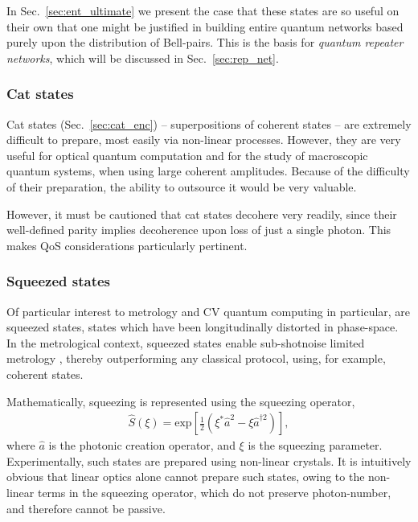 In Sec.~\ref{sec:ent_ultimate} we present the case that these states are so useful on their own that one might be justified in building entire quantum networks based purely upon the distribution of Bell-pairs. This is the basis for \textit{quantum repeater networks}, which will be discussed in Sec.~\ref{sec:rep_net}.

%
%

\subsubsection{Cat states} 

Cat states (Sec.~\ref{sec:cat_enc}) -- superpositions of coherent states -- are extremely difficult to prepare, most easily via non-linear processes. However, they are very useful for optical quantum computation and for the study of macroscopic quantum systems, when using large coherent amplitudes. Because of the difficulty of their preparation, the ability to outsource it would be very valuable.

However, it must be cautioned that cat states decohere very readily, since their well-defined parity implies decoherence upon loss of just a single photon. This makes QoS considerations particularly pertinent.

%
%

\subsubsection{Squeezed states} \label{sec:squeezed} 

Of particular interest to metrology and CV quantum computing in particular, are squeezed states, states which have been longitudinally distorted in phase-space. In the metrological context, squeezed states enable sub-shotnoise limited metrology \cite{???}, thereby outperforming any classical protocol, using, for example, coherent states.

Mathematically, squeezing is represented using the squeezing operator,
\begin{align}
\hat{S}(\xi) = \text{exp}\left[ \frac{1}{2}(\xi^*\hat{a}^2 - \xi{\hat{a}^{\dag 2}})\right],
\end{align}
where $\hat{a}$ is the photonic creation operator, and $\xi$ is the squeezing parameter. Experimentally, such states are prepared using non-linear crystals. It is intuitively obvious that linear optics alone cannot prepare such states, owing to the non-linear terms in the squeezing operator, which do not preserve photon-number, and therefore cannot be passive.

